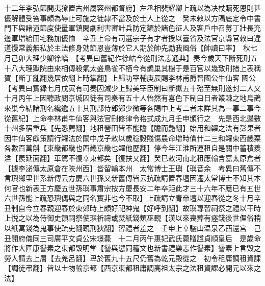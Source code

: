 十二年李弘節開夷獠置古州屬容州都督府】左丞相裴耀卿上疏以為决杖贖死恩則甚優解體受笞事頗為辱止可施之徒隸不當及於士人上從之　癸未敕以方隅底定令中書門下與諸道節度使量軍鎮閑劇利害審計兵防定額於諸色征人及客戶中召募丁壯長充邊軍增給田宅務加優恤　辛丑上命有司選宗子有才者授以臺省及法官京縣官敇曰違道慢常義無私於主法修身効節恩豈薄於它人期於帥先勵我風俗【帥讀曰率】　秋七月己卯大理少卿徐嶠　【考異曰舊紀作徐岵今從刑法志通典】奏今歲天下斷死刑五十八大理獄院由來相傳殺氣太盛鳥雀不栖今有鵲巢其樹于是百官以幾致刑措上表稱賀【斷丁亂翻幾居依翻上時掌翻】上歸功宰輔庚辰賜李林甫爵晉國公牛仙客國公　【考異曰實録七月戊寅有司奏囚減少上歸美宰臣制曰斷獄五十殆至無刑遂封二人又十月丙午上因聽政問京城囚徒有司奏有五十人怡然有喜色下制曰日者叢棘之地烏鵲來巢今結諸刑名纔逾五十其刑部侍郎鄭少微等各賜中上考二者未詳其為一事二事今從舊紀】上命李林甫牛仙客與法官刪修律令格式成九月壬申頒行之　先是西北邊數十州多宿重兵【先悉薦翻】地租營田皆不能贍【贍而艶翻】始用和糴之法有彭果者因牛仙客獻策請行糴法於關中戊子敕以歲稔穀賤傷農命增時價什二三和糴東西畿粟各數百萬斛【東畿都畿也西畿京畿也糴他歷翻】停今年江淮所運租自是關中蓄積羨溢【羨延面翻】車駕不復幸東都矣【復扶又翻】癸巳敕河南北租應輸含嘉太原倉者【據李泌傳太原倉在陜州西】皆留輸本州　太常博士王璵【璵音余　考異曰舊傳不言璵鄉里世系新傳云方慶六世孫又新舊傳皆云抗疏請置春壇因遷太常博士不知其本何官也新表王方慶五世孫璵事肅宗按方慶長安二年卒距此才三十六年不應已有五世六世孫能上疏恐璵偶與之同名實非也今不取】上疏請立青帝壇以迎春從之冬十月辛丑制自今立春親迎春於東郊時上頗好祀神鬼【好呼到翻】故璵專習祠祭之禮以干時上悦之以為侍御史領祠祭使璵祈禱或焚紙錢類巫覡【漢以來喪葬有瘞錢後世俚俗稍以紙寓錢為鬼事使疏吏翻覡刑狄翻】習禮者羞之　壬申上幸驪山温泉乙酉還宫　己丑開府儀同三司廣平文貞公宋璟薨　十二月丙午惠妃武氏薨贈諡貞順皇后　是歲命將作大匠康諐素之東都毁明堂【諐與愆同籕文也新書禮樂志作諐素】諐素上言毁之勞人請去上層【去羌呂翻】卑於舊九十五尺仍舊為乾元殿從之　初令租庸調租資課【調徒弔翻】皆以土物輸京都【西京東都租庸調高祖太宗之法租資課必開元以來之法】

